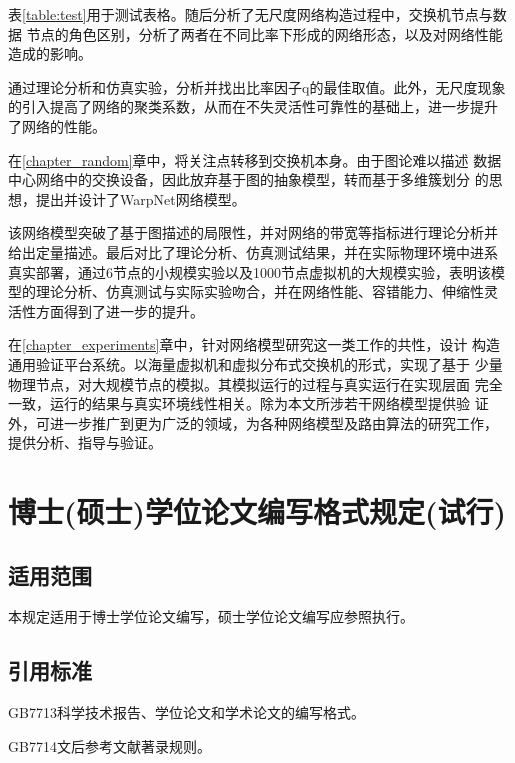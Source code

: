 \documentclass[oneside, phd]{njuthesis}
\begin{document}
表\ref{table:test}用于测试表格。随后分析了无尺度网络构造过程中，交换机节点与数据
节点的角色区别，分析了两者在不同比率下形成的网络形态，以及对网络性能造成的影响。

通过理论分析和仿真实验，分析并找出比率因子q的最佳取值。此外，无尺度现象
的引入提高了网络的聚类系数，从而在不失灵活性可靠性的基础上，进一步提升
了网络的性能。

在\ref{chapter_random}章中，将关注点转移到交换机本身。由于图论难以描述
数据中心网络中的交换设备，因此放弃基于图的抽象模型，转而基于多维簇划分
的思想，提出并设计了WarpNet网络模型。

该网络模型突破了基于图描述的局限性，并对网络的带宽等指标进行理论分析并
给出定量描述。最后对比了理论分析、仿真测试结果，并在实际物理环境中进系
真实部署，通过6节点的小规模实验以及1000节点虚拟机的大规模实验，表明该模
型的理论分析、仿真测试与实际实验吻合，并在网络性能、容错能力、伸缩性灵
活性方面得到了进一步的提升。

在\ref{chapter_experiments}章中，针对网络模型研究这一类工作的共性，设计
构造通用验证平台系统。以海量虚拟机和虚拟分布式交换机的形式，实现了基于
少量物理节点，对大规模节点的模拟。其模拟运行的过程与真实运行在实现层面
完全一致，运行的结果与真实环境线性相关。除为本文所涉若干网络模型提供验
证外，可进一步推广到更为广泛的领域，为各种网络模型及路由算法的研究工作，
提供分析、指导与验证。


\appendix

\chapter{博士(硕士)学位论文编写格式规定(试行)}

\section{适用范围}

本规定适用于博士学位论文编写，硕士学位论文编写应参照执行。

\section{引用标准}

GB7713科学技术报告、学位论文和学术论文的编写格式。

GB7714文后参考文献著录规则。
\end{document}
